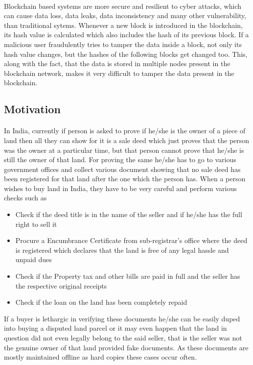 \documentclass{article}
\begin{document}
        \paragraph{}
        Blockchain based systems are more secure and resilient to cyber attacks, which can cause data loss, data leaks, data inconsistency and many other vulnerability, than traditional sytems. Whenever a new block is introduced in the blockchain, its hash value is calculated which also includes the hash of its previous block. If a malicious user fraudulently tries to tamper the data inside a block, not only its hash value changes, but the hashes of the following blocks get changed too. This, along with the fact, that the data is stored in multiple nodes present in the blockchain network, makes it very difficult to tamper the data present in the blockchain.
        
        \paragraph{}
        
    \subsection{Motivation}
        \paragraph{}
        In India, currently if person is asked to prove if he/she is the owner of a piece of land then all they can show for it is a sale deed which just proves that the person was the owner at a particular time, but that person cannot prove that he/she is still the owner of that land. For proving the same he/she has to go to various government offices and collect various document showing that no sale deed has been registered for that land after the one which the person has. When a person wishes to buy land in India, they have to be very careful and perform various checks such as
        \begin{itemize}
            \item Check if the deed title is in the name of the seller and if he/she has the full right to sell it
            \item Procure a Encumbrance Certificate from sub-registrar's office where the deed is registered which declares that the land is free of any legal hassle and unpaid dues
            \item Check if the Property tax and other bills are paid in full and the seller has the respective original receipts
            \item Check if the loan on the land has been completely repaid
        \end{itemize}
        If a buyer is lethargic in verifying these documents he/she can be easily duped into buying a disputed land parcel or it may even happen that the land in question did not even legally belong to the said seller, that is the seller was not the genuine owner of that land provided fake documents. As these documents are mostly maintained offline as hard copies these cases occur often.
\end{document}
